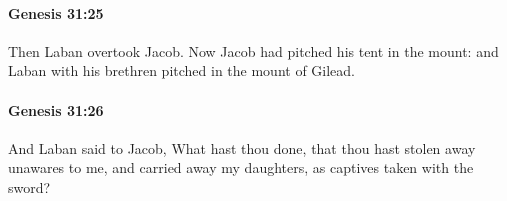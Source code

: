 		\paragraph{Genesis 31:25} %
			\label{GENESIS-31-25}

			Then Laban overtook Jacob. Now Jacob had pitched his tent in the mount: and Laban with his brethren pitched in the mount of Gilead.


		\paragraph{Genesis 31:26} %
			\label{GENESIS-31-26}

			And Laban said to Jacob, What hast thou done, that thou hast stolen away unawares to me, and carried away my daughters, as captives taken with the sword?


